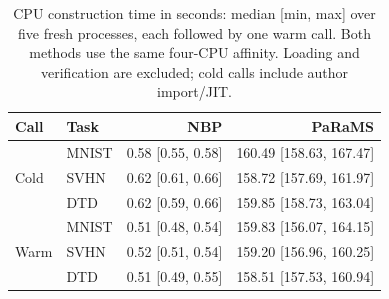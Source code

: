 \begin{table}[!htbp]
\centering
\small
\setlength{\tabcolsep}{2pt}
\caption{CPU construction time in seconds: median [min, max] over five fresh processes, each followed by one warm call. Both methods use the same four-CPU affinity. Loading and verification are excluded; cold calls include author import/JIT.}
\label{tab:cost}
\begin{tabular}{llrr}
\toprule
Call & Task & NBP & PaRaMS \\
\midrule
\multirow{3}{*}{Cold} & MNIST & 0.58 [0.55, 0.58] & 160.49 [158.63, 167.47] \\
 & SVHN & 0.62 [0.61, 0.66] & 158.72 [157.69, 161.97] \\
 & DTD & 0.62 [0.59, 0.66] & 159.85 [158.73, 163.04] \\
\midrule
\multirow{3}{*}{Warm} & MNIST & 0.51 [0.48, 0.54] & 159.83 [156.07, 164.15] \\
 & SVHN & 0.52 [0.51, 0.54] & 159.20 [156.96, 160.25] \\
 & DTD & 0.51 [0.49, 0.55] & 158.51 [157.53, 160.94] \\
\bottomrule
\end{tabular}
\end{table}
